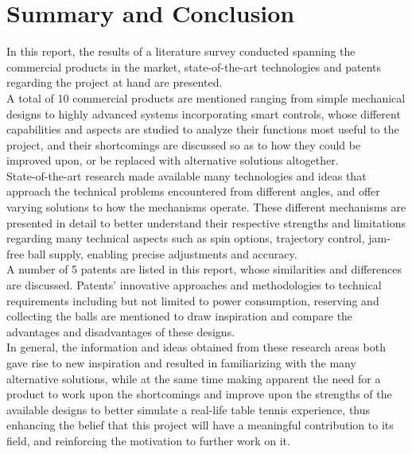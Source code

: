 \documentclass[12pt]{report}
\begin{document}
\section{Summary and Conclusion}
In this report, the results of a literature survey conducted spanning the commercial products in the market, state-of-the-art technologies and patents regarding the project at hand are presented. \\

A total of 10 commercial products are mentioned ranging from simple mechanical designs to highly advanced systems incorporating smart controls, whose different capabilities and aspects are studied to analyze their functions most useful to the project, and their shortcomings are discussed so as to how they could be improved upon, or be replaced with alternative solutions altogether. \\

State-of-the-art research made available many technologies and ideas that approach the technical problems encountered from different angles, and offer varying solutions to how the mechanisms operate. These different mechanisms are presented in detail to better understand their respective strengths and limitations regarding many technical aspects such as spin options, trajectory control, jam-free ball supply, enabling precise adjustments and accuracy. \\

A number of 5 patents are listed in this report, whose similarities and differences are discussed. Patents’ innovative approaches and methodologies to technical requirements including but not limited to power consumption, reserving and collecting the balls are mentioned to draw inspiration and compare the advantages and disadvantages of these designs. \\

In general, the information and ideas obtained from these research areas both gave rise to new inspiration and resulted in familiarizing with the many alternative solutions, while at the same time making apparent the need for a product to work upon the shortcomings and improve upon the strengths of the available designs to better simulate a real-life table tennis experience, thus enhancing the belief that this project will have a meaningful contribution to its field, and reinforcing the motivation to further work on it.

\newpage
\end{document}
